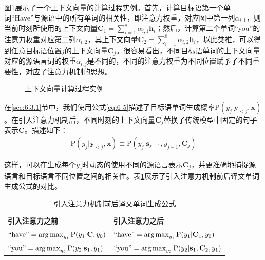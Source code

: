 \parinterval 图\ref{fig:6-25}展示了一个上下文向量的计算过程实例。首先，计算目标语第一个单词``Have''与源语中的所有单词的相关性，即注意力权重，对应图中第一列$\alpha_{i,1}$，则当前时刻所使用的上下文向量$\mathbf{C}_1 = \sum_{i=1}^8 \alpha_{i,1} \mathbf{h}_i$；然后，计算第二个单词``you''的注意力权重对应第二列$\alpha_{i,2}$，其上下文向量$\mathbf{C}_2 = \sum_{i=1}^8 \alpha_{i,2} \mathbf{h}_i$，以此类推，可以得到任意目标语位置$j$的上下文向量$\mathbf{C}_j$。很容易看出，不同目标语单词的上下文向量对应的源语言词的权重$\alpha_{i,j}$是不同的，不同的注意力权重为不同位置赋予了不同重要性，对应了注意力机制的思想。

\begin{figure}[htp]
\centering

\caption{上下文向量计算过程实例}
\label{fig:6-25}
\end{figure}

\parinterval 在\ref{sec:6.3.1}节中，我们使用公式\ref{eq:6-5}描述了目标语单词生成概率P$(y_j | \mathbf{y}_{<j},\mathbf{x})$。在引入注意力机制后，不同时刻的上下文向量$\mathbf{C}_j$替换了传统模型中固定的句子表示$\mathbf{C}$。描述如下：
\begin{eqnarray}
\textrm{P} (y_j | \mathbf{y}_{<j},\mathbf{x}) \equiv \textrm{P} (y_j | \mathbf{s}_{j-1},y_{j-1},\mathbf{C}_j )
\label{eq:6-26}
\end{eqnarray}

\parinterval 这样，可以在生成每个$y_j$时动态的使用不同的源语言表示$\mathbf{C}_j$，并更准确地捕捉源语言和目标语言不同位置之间的相关性。表\ref{tab:6-7}展示了引入注意力机制前后译文单词生成公式的对比。
\vspace{0.5em}

\begin{table}[htp]
\centering
\caption{引入注意力机制前后译文单词生成公式}
\label{tab:6-7}
\begin{tabular}{ l | l }
\rule{0pt}{13pt}	引入注意力之前			&引入注意力之后 \\ \hline
\rule{0pt}{16pt}	$\textrm{``have''} = \operatorname*{arg\,max}_{y_1}\mathrm{P}(y_1 | \mathbf{C} , y_0)$		&$\textrm{``have''} = \operatorname*{arg\,max}_{y_1}\mathrm{P}(y_1 | \mathbf{C}_1 , y_0)$	\\
\rule{0pt}{16pt}	$\textrm{``you''} = \operatorname*{arg\,max}_{y_2}\mathrm{P}(y_2 | \mathbf{s}_1 , y_1)$			&$\textrm{``you''} = \operatorname*{arg\,max}_{y_2}\mathrm{P}(y_2 | \mathbf{s}_1, \mathbf{C}_2 , y_1)$	\\
\end{tabular}
\end{table}

